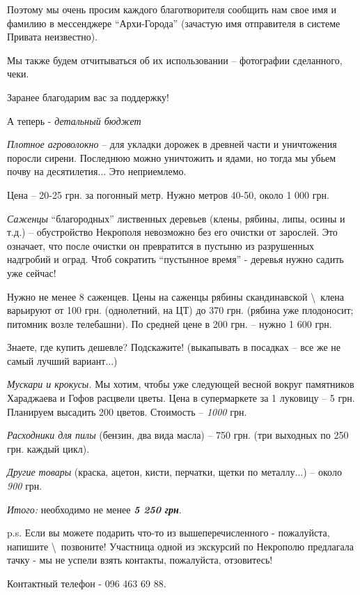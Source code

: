 Поэтому мы очень просим каждого благотворителя сообщить нам свое имя и фамилию
в мессенджере \enquote{Архи-Города} (зачастую имя отправителя в системе Привата
неизвестно).

Мы также будем отчитываться об их использовании – фотографии сделанного, чеки.

Заранее благодарим вас за поддержку!

А теперь - \emph{детальный бюджет}

\emph{Плотное агроволокно} – для укладки дорожек в древней части и уничтожения поросли
сирени. Последнюю можно уничтожить и ядами, но тогда мы убьем почву на
десятилетия... Это неприемлемо.

Цена – 20-25 грн. за погонный метр. Нужно метров 40-50, около 1 000 грн.

\emph{Саженцы} \enquote{благородных} лиственных деревьев (клены, рябины, липы, осины и т.д.) –
обустройство Некрополя невозможно без его очистки от зарослей. Это означает,
что после очистки он превратится в пустыню из разрушенных надгробий и оград.
Чтоб сократить \enquote{пустынное время} - деревья нужно садить уже сейчас!

Нужно не менее 8 саженцев. Цены на саженцы рябины скандинавской \textbackslash\ клена
варьируют от 100 грн. (однолетний, на ЦТ) до 370 грн. (рябина уже плодоносит;
питомник возле телебашни). По средней цене в 200 грн. – нужно 1 600 грн.

Знаете, где купить дешевле? Подскажите! (выкапывать в посадках – все же не
самый лучший вариант...)

\emph{Мускари и крокусы.} Мы хотим, чтобы уже следующей весной вокруг памятников
Хараджаева и Гофов расцвели цветы. Цена в супермаркете за 1 луковицу – 5 грн.
Планируем высадить 200 цветов. Стоимость – \emph{1000} грн.

\emph{Расходники для пилы} (бензин, два вида масла) – 750 грн. (три выходных по 250
грн. каждый цикл).

\emph{Другие товары} (краска, ацетон, кисти, перчатки, щетки по металлу...) – около \emph{900}
грн.

\emph{Итого:} необходимо не менее \textbf{\emph{5 250 грн}}.

p.s. Если вы можете подарить что-то из вышеперечисленного - пожалуйста,
напишите \textbackslash\ позвоните! Участница одной из экскурсий по Некрополю предлагала
тачку - мы не успели взять контакты, пожалуйста, отзовитесь!

Контактный телефон - 096 463 69 88. 
